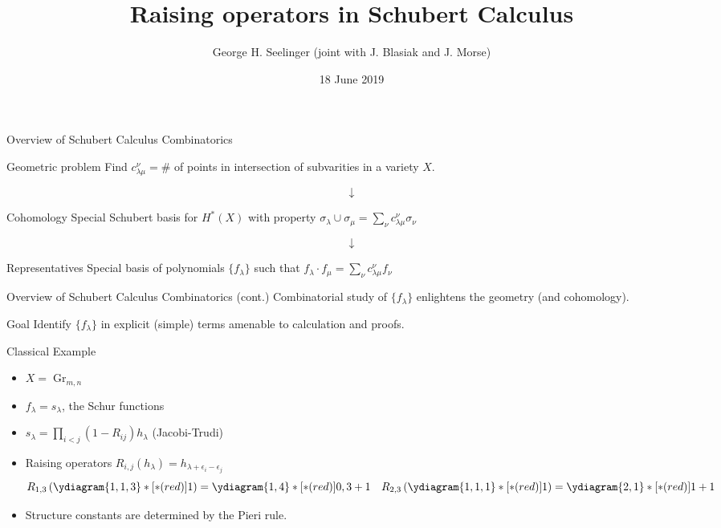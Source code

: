 \documentclass{beamer}
\title[Raising operators in Schubert Calculus]{Raising operators in Schubert Calculus} %
\author[George H. Seelinger]{George H. Seelinger (joint with
  J. Blasiak and J. Morse)} %
\institute[UVA] %
{
GarsiaFest 2019 \\ %
\medskip
\textit{ghs9ae@virginia.edu} %
}
\date{18 June 2019} %
\DeclareMathOperator{\Gr}{Gr}
\newcommand{\cupprod}{\cup}
\begin{document}
\begin{frame}
\titlepage %
\end{frame}
\begin{frame}{Overview of Schubert Calculus Combinatorics}
  \begin{block}{Geometric problem}
    Find \(c_{\lambda \mu}^\nu = \#\) of points in
    intersection of subvarities in a variety \(X\).
  \end{block}
  \[
    \downarrow
  \]
  \begin{block}{Cohomology}
    Special Schubert basis for \(H^*(X)\) with property \(\sigma_\lambda \cupprod \sigma_\mu = \sum_\nu c_{\lambda \mu}^\nu \sigma_\nu\)
\end{block}
\[
  \downarrow
\]
\begin{block}{Representatives}
  Special basis of polynomials \(\{f_\lambda\}\) such that \(f_\lambda \cdot f_\mu = \sum_\nu c_{\lambda \mu}^\nu f_\nu\)
\end{block}
\end{frame}
\begin{frame}{Overview of Schubert Calculus Combinatorics (cont.)}
  Combinatorial study of \(\{f_\lambda\}\) enlightens the geometry
  (and cohomology).
  \begin{alertblock}{Goal}
    Identify \(\{f_\lambda\}\) in explicit (simple) terms amenable to
    calculation and proofs.
  \end{alertblock}
\end{frame}
\begin{frame}{Classical Example}
  \begin{example}
    \begin{itemize}
    \item \(X = \Gr_{m,n}\)
    \item \(f_\lambda = s_\lambda\), the Schur functions
    \item \(s_\lambda = \prod_{i < j} (1-R_{ij})h_\lambda\)
      (Jacobi-Trudi)
      \item Raising operators
    \(R_{i,j}(h_\lambda) = h_{\lambda+\epsilon_i-\epsilon_j}\)
    \[
      R_{1,3} \left( \ydiagram{1,1,3}*[*(red)]{1} \right) =
      \ydiagram{1,4}*[*(red)]{0,3+1} \ \ \ R_{2,3} \left(
        \ydiagram{1,1,1}*[*(red)]{1} \right) =
      \ydiagram{2,1}*[*(red)]{1+1}
    \]
    \item Structure constants are determined by the Pieri rule. 
    \end{itemize}
  \end{example}
\end{frame}
\end{document}
